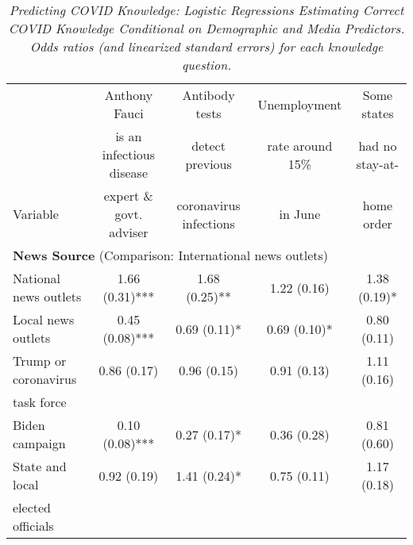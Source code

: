 \documentclass[11pt]{article}
\begin{document}
\newpage
{} %
\begin{landscape}
\thispagestyle{empty}


\begin{table}
  \caption[Predicting COVID Knowledge: Logistic Regressions Estimating Correct COVID Knowledge Conditional on Demographic and Media Predictors.]
  {\emph{Predicting COVID Knowledge: Logistic Regressions Estimating Correct
  COVID Knowledge Conditional on Demographic and Media Predictors. Odds ratios
  (and linearized standard errors) for each knowledge question. }}
  \label{table:COVIDKnowledgeORs}
  \begin{tabular}{l|c|c|c|c}
    \hline   %
                          & Anthony Fauci            & Antibody tests          & Unemployment      & Some states\\
                          & is an infectious disease & detect previous         & rate around 15\%  & had no stay-at- \\
    Variable              & expert \& govt. adviser  & coronavirus infections  & in June           & home order \\
    \hline
    \multicolumn{4}{l}{{\bf News Source} (Comparison:  International news outlets)}   \\
      \enspace National news outlets &  1.66 (0.31)***    & 1.68 (0.25)**      &  1.22 (0.16)      & 1.38 (0.19)*     \\
      \enspace Local news outlets    &  0.45 (0.08)***    & 0.69 (0.11)*       &  0.69 (0.10)*     & 0.80 (0.11)      \\
      \enspace Trump or coronavirus  &  0.86 (0.17)       & 0.96 (0.15)        &  0.91 (0.13)      & 1.11 (0.16)     \\
      \enspace task force            &                    &                    &                   &      \\
      \enspace Biden campaign        &  0.10 (0.08)***    & 0.27 (0.17)*       &  0.36 (0.28)      & 0.81 (0.60)   \\
      \enspace State and local       &  0.92 (0.19)       & 1.41 (0.24)*       &  0.75 (0.11)      & 1.17 (0.18)  \\
      \enspace elected officials     &                    &                    &                   &       \\

\end{tabular}
\end{table}
\end{landscape}
\end{document}
